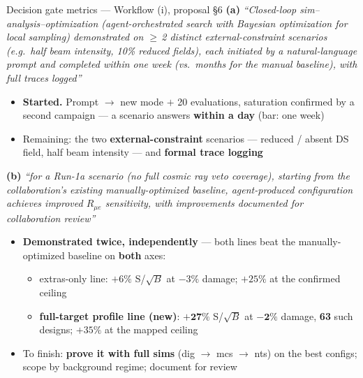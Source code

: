 \documentclass[aspectratio=169,10pt]{beamer}
\begin{document}
\begin{frame}{Decision gate metrics --- Workflow (i), proposal \S6}
\footnotesize
\textbf{(a)} \emph{``Closed-loop sim--analysis--optimization (agent-orchestrated search with Bayesian
optimization for local sampling) demonstrated on $\ge$\,2 distinct external-constraint scenarios
(e.g.\ half beam intensity, 10\% reduced fields), each initiated by a natural-language prompt and
completed within one week (vs.\ months for the manual baseline), with full traces logged''}
\begin{itemize}\footnotesize
  \item[$\rightarrow$] \textbf{Started.} Prompt $\rightarrow$ new mode $+$ 20 evaluations, saturation confirmed by a second campaign --- a scenario answers \textbf{within a day} (bar: one week)
  \item[$\rightarrow$] Remaining: the two \textbf{external-constraint} scenarios --- reduced / absent DS field, half beam intensity --- and \textbf{formal trace logging}
\end{itemize}
\vspace{0.7em}

\textbf{(b)} \emph{``for a Run-1a scenario (no full cosmic ray veto coverage), starting from the
collaboration's existing manually-optimized baseline, agent-produced configuration achieves improved
$R_{\mu e}$ sensitivity, with improvements documented for collaboration review''}
\begin{itemize}\footnotesize
  \item[$\rightarrow$] \textcolor{okgreen}{\textbf{Demonstrated twice, independently}} --- both lines beat the manually-optimized baseline on \textbf{both} axes:
  \begin{itemize}\scriptsize
    \item extras-only line: $+6\%$ S/$\sqrt{B}$ at $-3\%$ damage; $+25\%$ at the confirmed ceiling
    \item \textbf{full-target profile line (new)}: $\mathbf{+27\%}$ S/$\sqrt{B}$ at $\mathbf{-2\%}$ damage, \textbf{63} such designs; $+35\%$ at the mapped ceiling
  \end{itemize}
  \item[$\rightarrow$] To finish: \textbf{prove it with full sims} (dig $\rightarrow$ mcs $\rightarrow$ nts) on the best configs; scope by background regime; document for review
\end{itemize}
\end{frame}
\end{document}
